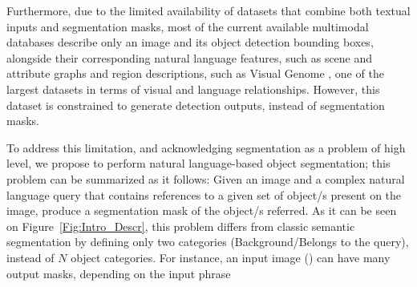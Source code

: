 Furthermore, due to the limited availability of datasets that combine both textual inputs and segmentation masks, most of the current available multimodal databases describe only an image and its object detection bounding boxes, alongside their corresponding natural language features, such as scene and attribute graphs and region descriptions, such as Visual Genome \cite{krishna_visual_2016}, one of the largest datasets in terms of visual and language relationships. However, this dataset is constrained to generate detection outputs, instead of segmentation masks.

To address this limitation, and acknowledging segmentation as a problem of high level, we propose to perform natural language-based object segmentation; this problem can be summarized as it follows: Given an image and a complex natural language query that contains references to a given set of object/s present on the image, produce a segmentation mask of the object/s referred. As it can be seen on Figure~\ref{Fig:Intro_Descr}, this problem differs from classic semantic segmentation by defining only two categories (Background/Belongs to the query), instead of $N$ object categories. For instance, an input image () can have many output masks, depending on the input phrase

